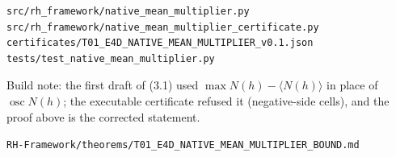 \begin{verbatim}
src/rh_framework/native_mean_multiplier.py
src/rh_framework/native_mean_multiplier_certificate.py
certificates/T01_E4D_NATIVE_MEAN_MULTIPLIER_v0.1.json
tests/test_native_mean_multiplier.py
\end{verbatim}

Build note: the first draft of (3.1) used \(\max N(h)-\langle N(h)\rangle\)
in place of \(\operatorname{osc}N(h)\); the executable certificate refused it
(negative-side cells), and the proof above is the corrected statement.

\begin{flushright}\small\texttt{RH-Framework/theorems/T01\_E4D\_NATIVE\_MEAN\_MULTIPLIER\_BOUND.md}\end{flushright}
